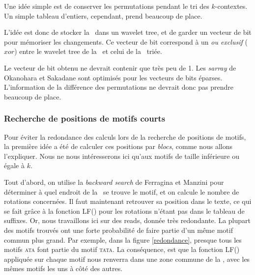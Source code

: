 Une idée simple est de conserver les permutations pendant le tri des $k$-contextes. Un simple tableau d'entiers, cependant, prend beaucoup de place.

L'idée est donc de stocker la \kbwt\ dans un wavelet tree, et de garder un vecteur de bit pour mémoriser les changements. Ce vecteur de bit correspond à un \textit{ou exclusif} ($xor$) entre le wavelet tree de la \kbwt\ et celui de la \kbwt\ triée.

Le vecteur de bit obtenu ne devrait contenir que très peu de 1. Les \textit{sarray} de Okanohara et Sakadane sont optimisés pour les vecteurs de bits éparses. L'information de la différence des permutations ne devrait donc pas prendre beaucoup de place.


\subsubsection{Recherche de positions de motifs courts}
Pour éviter la redondance des calculs lors de la recherche de positions de motifs, la première idée a été de calculer ces positions par \textit{blocs}, comme nous allons l'expliquer. Nous ne nous intéresserons ici qu'aux motifs de taille inférieure ou égale à $k$. 

Tout d'abord, on utilise la \textit{backward search} de Ferragina et Manzini pour déterminer à quel endroit de la \kbwt\ se trouve le motif, et on calcule le nombre de rotations concernées. Il faut maintenant retrouver sa position dans le texte, ce qui se fait grâce à la fonction LF() pour les rotations n'étant pas dans le tableau de suffixes. Or, nous travaillons ici sur des reads, donnée très redondante. La plupart des motifs trouvés ont une forte probabilité de faire partie d'un même motif commun plus grand. Par exemple, dans la figure \ref{redondance}, presque tous les motifs \textsc{ata} font partie du motif \textsc{tata}. La conséquence, est que la fonction LF() appliquée sur chaque motif nous renverra dans une zone commune de la \kbwt, avec les mêmes motifs les uns à côté des autres.

